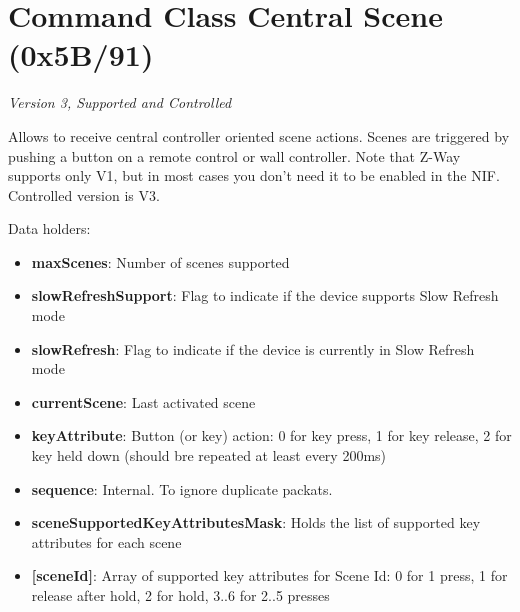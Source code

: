 \section{Command Class Central Scene (0x5B/91)}

\textit{Version 3, Supported and Controlled}
\newline

Allows to receive central controller oriented scene actions. Scenes are triggered by pushing a button on a remote control or wall controller. Note that Z-Way supports only V1, but in most cases you don't need it to be enabled in the NIF. Controlled version is V3.
\newline

\noindent
Data holders:

\begin{itemize}
\item \textbf{maxScenes}: Number of scenes supported
\item \textbf{slowRefreshSupport}: Flag to indicate if the device supports Slow Refresh mode
\item \textbf{slowRefresh}: Flag to indicate if the device is currently in Slow Refresh mode
\item \textbf{currentScene}: Last activated scene
\item \textbf{keyAttribute}: Button (or key) action: 0 for key press, 1 for key release, 2 for key held down (should bre repeated at least every 200ms)
\item \textbf{sequence}: Internal. To ignore duplicate packats.
\item \textbf{sceneSupportedKeyAttributesMask}: Holds the list of supported key attributes for each scene
\item \qquad\textbf{[sceneId]}: Array of supported key attributes for Scene Id: 0 for 1 press, 1 for release after hold, 2 for hold, 3..6 for 2..5 presses
\end{itemize}
